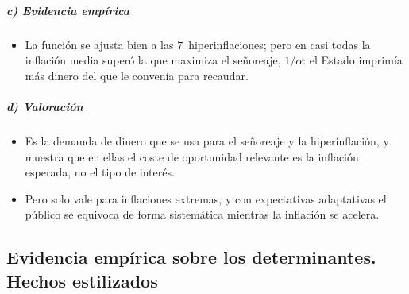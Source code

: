 \documentclass[11pt]{article}
\begin{document}
\subparagraph{c) Evidencia empírica}

\begin{itemize}
\item La función se ajusta bien a las 7~hiperinflaciones; pero en casi todas la inflación media superó la que maximiza el señoreaje, $1/\alpha$: el Estado imprimía más dinero del que le convenía para recaudar\nocite{Cagan1956Monetary}.
\end{itemize}

\subparagraph{d) Valoración}

\begin{itemize}
\item Es la demanda de dinero que se usa para el señoreaje y la hiperinflación, y muestra que en ellas el coste de oportunidad relevante es la inflación esperada, no el tipo de interés.
\item Pero solo vale para inflaciones extremas, y con expectativas adaptativas el público se equivoca de forma sistemática mientras la inflación se acelera.
\end{itemize}

\subsection{Evidencia empírica sobre los determinantes.\cortetitulo{} Hechos estilizados}\label{sec:evidencia}
\end{document}
